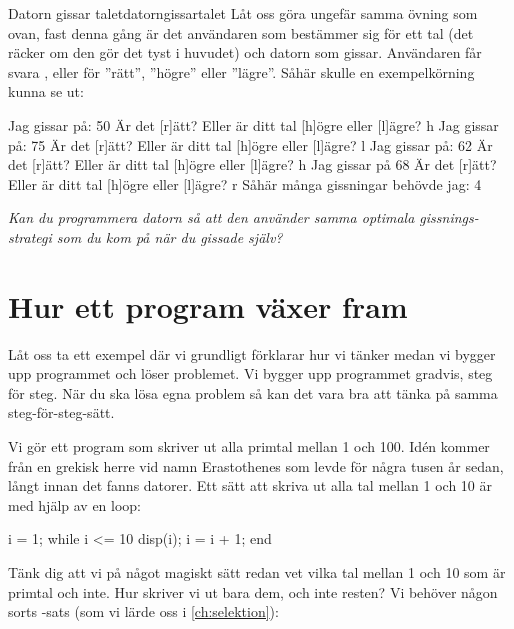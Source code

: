 \begin{matteovningm}{Datorn gissar talet}{datorngissartalet}
Låt oss göra ungefär samma övning som ovan, fast denna gång är det användaren som bestämmer sig för ett tal (det räcker om den gör det tyst i huvudet) och datorn som gissar. Användaren får svara ,  eller  för ''rätt'', ''högre'' eller ''lägre''. Såhär skulle en exempelkörning kunna se ut:

\vspace{10pt}
\begin{matlab}
Jag gissar på:
50
Är det [r]ätt? Eller är ditt tal [h]ögre eller [l]ägre? h
Jag gissar på:
75
Är det [r]ätt? Eller är ditt tal [h]ögre eller [l]ägre? l
Jag gissar på:
62
Är det [r]ätt? Eller är ditt tal [h]ögre eller [l]ägre? h
Jag gissar på
68
Är det [r]ätt? Eller är ditt tal [h]ögre eller [l]ägre? r
Såhär många gissningar behövde jag:
4
\end{matlab}

\emph{Kan du programmera datorn så att den använder samma optimala gissnings-strategi som du kom på när du gissade själv?}
\end{matteovningm}


\section{Hur ett program växer fram}

Låt oss ta ett exempel där vi grundligt förklarar hur vi tänker medan vi bygger upp programmet och löser problemet. Vi bygger upp programmet gradvis, steg för steg. När du ska lösa egna problem så kan det vara bra att tänka på samma steg-för-steg-sätt.

Vi gör ett program som skriver ut alla primtal mellan 1 och 100. Idén kommer från en grekisk herre vid namn Erastothenes som levde för några tusen år sedan, långt innan det fanns datorer.
\newpage
Ett sätt att skriva ut alla tal mellan 1 och 10 är med hjälp av en loop:
\vspace{10pt}
\begin{matlab}
i = 1;
while i <= 10
	disp(i);
	i = i + 1;
end
\end{matlab}

Tänk dig att vi på något magiskt sätt redan vet vilka tal mellan 1 och 10 som är primtal och inte. Hur skriver vi ut bara dem, och inte resten? Vi behöver någon sorts -sats (som vi lärde oss i \autoref{ch:selektion}):

